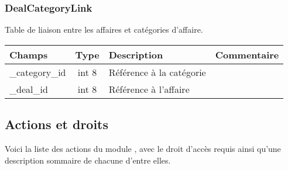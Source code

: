 \subsubsection{DealCategoryLink}
Table de liaison entre les affaires et catégories d'affaire.\\

\begin{tabular}{|p{3cm}|c|p{5.4cm}|p{2.6cm}|}
\hline
\textbf{Champs} & \textbf{Type} & \textbf{Description} & \textbf{Commentaire} \\
\hline
\_category\_id & int 8 & Référence à la catégorie & \\
\hline
\_deal\_id & int 8 & Référence à l'affaire & \\
\hline
\end{tabular}


\subsection{Actions et droits}

Voici la liste des actions du module \project, avec le droit d'accès requis ainsi qu'une description sommaire de chacune d'entre elles.\\

